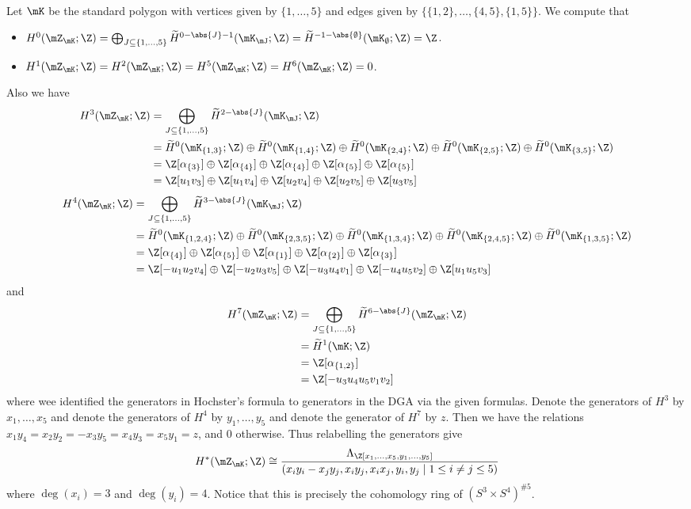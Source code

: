 \documentclass[a4paper]{article}
\begin{document}
\begin{eg}{}{}\\
Let $\mK$ be the standard polygon with vertices given by $\{1,\dots,5\}$ and edges given by $\{\{1,2\},\dots,\{4,5\},\{1,5\}\}$. We compute that 
\begin{itemize}
\item $H^0(\mZ_\mK;\Z)=\bigoplus_{J\subseteq\{1,\dots,5\}}\widetilde{H}^{0-\abs{J}-1}(\mK_\mJ;\Z)=\widetilde{H}^{-1-\abs{\emptyset}}(\mK_\emptyset;\Z)=\Z$. 
\item $H^1(\mZ_\mK;\Z)=H^2(\mZ_\mK;\Z)=H^5(\mZ_\mK;\Z)=H^6(\mZ_\mK;\Z)=0$. 
\end{itemize}
Also we have 
\begin{align*}
H^3(\mZ_\mK;\Z)&=\bigoplus_{J\subseteq\{1,\dots,5\}}\widetilde{H}^{2-\abs{J}}(\mK_\mJ;\Z)\\
&=\widetilde{H}^0(\mK_{\{1,3\}};\Z)\oplus\widetilde{H}^0(\mK_{\{1,4\}};\Z)\oplus\widetilde{H}^0(\mK_{\{2,4\}};\Z)\oplus\widetilde{H}^0(\mK_{\{2,5\}};\Z)\oplus\widetilde{H}^0(\mK_{\{3,5\}};\Z)\\
&=\Z[\alpha_{\{3\}}]\oplus\Z[\alpha_{\{4\}}]\oplus\Z[\alpha_{\{4\}}]\oplus\Z[\alpha_{\{5\}}]\oplus\Z[\alpha_{\{5\}}]\\
&=\Z[u_1v_3]\oplus\Z[u_1v_4]\oplus\Z[u_2v_4]\oplus\Z[u_2v_5]\oplus\Z[u_3v_5]
\end{align*}
\begin{align*}
H^4(\mZ_\mK;\Z)&=\bigoplus_{J\subseteq\{1,\dots,5\}}\widetilde{H}^{3-\abs{J}}(\mK_\mJ;\Z)\\
&=\widetilde{H}^0(\mK_{\{1,2,4\}};\Z)\oplus\widetilde{H}^0(\mK_{\{2,3,5\}};\Z)\oplus\widetilde{H}^0(\mK_{\{1,3,4\}};\Z)\oplus\widetilde{H}^0(\mK_{\{2,4,5\}};\Z)\oplus\widetilde{H}^0(\mK_{\{1,3,5\}};\Z)\\
&=\Z[\alpha_{\{4\}}]\oplus\Z[\alpha_{\{5\}}]\oplus\Z[\alpha_{\{1\}}]\oplus\Z[\alpha_{\{2\}}]\oplus\Z[\alpha_{\{3\}}]\\
&=\Z[-u_1u_2v_4]\oplus\Z[-u_2u_3v_5]\oplus\Z[-u_3u_4v_1]\oplus\Z[-u_4u_5v_2]\oplus\Z[u_1u_5v_3]
\end{align*}
and 
\begin{align*}
H^7(\mZ_\mK;\Z)&=\bigoplus_{J\subseteq\{1,\dots,5\}}\widetilde{H}^{6-\abs{J}}(\mZ_\mK;\Z)\\
&=\widetilde{H}^1(\mK;\Z)\\
&=\Z[\alpha_{\{1,2\}}]\\
&=\Z[-u_3u_4u_5v_1v_2]
\end{align*}
where wee identified the generators in Hochster's formula to generators in the DGA via the given formulas. Denote the generators of $H^3$ by $x_1,\dots,x_5$ and denote the generators of $H^4$ by $y_1,\dots,y_5$ and denote the generator of $H^7$ by $z$. Then we have the relations $x_1y_4=x_2y_2=-x_3y_5=x_4y_3=x_5y_1=z$, and $0$ otherwise. Thus relabelling the generators give $$H^\ast(\mZ_\mK;\Z)\cong\frac{\Lambda_\Z[x_1,\dots,x_5,y_1,\dots,y_5]}{(x_iy_i-x_jy_j,x_iy_j,x_ix_j,y_i,y_j\;|\;1\leq i\neq j\leq 5)}$$ where $\deg(x_i)=3$ and $\deg(y_i)=4$. Notice that this is precisely the cohomology ring of $(S^3\times S^4)^{\#5}$. 
\end{eg}
\end{document}
